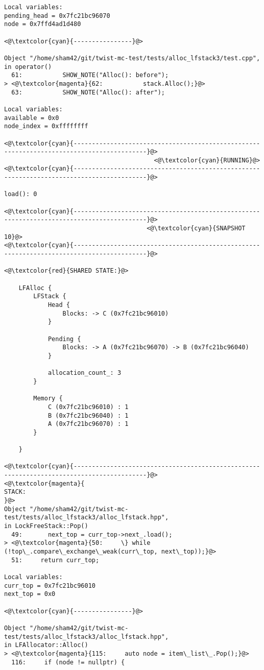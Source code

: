 \begin{adjustwidth}{-3.3cm}{-1cm}
\begin{allintypewriter}
\begin{multicols*}{2}
\begin{lstlisting}[numbers=none]
Local variables: 
pending_head = 0x7fc21bc96070
node = 0x7ffd4ad1d480

<@\textcolor{cyan}{----------------}@>

Object "/home/sham42/git/twist-mc-test/tests/alloc_lfstack3/test.cpp",
in operator()
  61:           SHOW_NOTE("Alloc(): before");
> <@\textcolor{magenta}{62:           stack.Alloc();}@>
  63:           SHOW_NOTE("Alloc(): after");

Local variables: 
available = 0x0
node_index = 0xffffffff

<@\textcolor{cyan}{------------------------------------------------------------------------------------------}@>
                                         <@\textcolor{cyan}{RUNNING}@>
<@\textcolor{cyan}{------------------------------------------------------------------------------------------}@>

load(): 0

<@\textcolor{cyan}{------------------------------------------------------------------------------------------}@>
                                       <@\textcolor{cyan}{SNAPSHOT 10}@>
<@\textcolor{cyan}{------------------------------------------------------------------------------------------}@>

<@\textcolor{red}{SHARED STATE:}@>

    LFAlloc {
	    LFStack {
		    Head {
			    Blocks: -> C (0x7fc21bc96010) 
		    }

		    Pending {
			    Blocks: -> A (0x7fc21bc96070) -> B (0x7fc21bc96040) 
		    }

		    allocation_count_: 3
	    }

	    Memory {
		    C (0x7fc21bc96010) : 1
		    B (0x7fc21bc96040) : 1
		    A (0x7fc21bc96070) : 1
	    }

    }

<@\textcolor{cyan}{------------------------------------------------------------------------------------------}@>
<@\textcolor{magenta}{
STACK:
}@>
Object "/home/sham42/git/twist-mc-test/tests/alloc_lfstack3/alloc_lfstack.hpp",
in LockFreeStack::Pop()
  49:       next_top = curr_top->next_.load();
> <@\textcolor{magenta}{50:     \} while (!top\_.compare\_exchange\_weak(curr\_top, next\_top));}@>
  51:     return curr_top;

Local variables: 
curr_top = 0x7fc21bc96010
next_top = 0x0

<@\textcolor{cyan}{----------------}@>

Object "/home/sham42/git/twist-mc-test/tests/alloc_lfstack3/alloc_lfstack.hpp",
in LFAllocator::Alloc()
> <@\textcolor{magenta}{115:     auto node = item\_list\_.Pop();}@>
  116:     if (node != nullptr) {


\end{lstlisting}
\end{multicols*}
\end{allintypewriter}
\end{adjustwidth}
